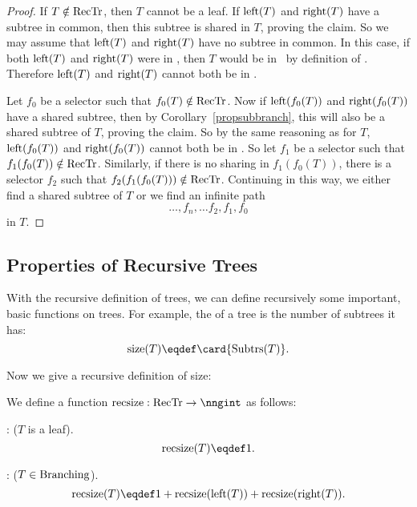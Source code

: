 \begin{proof}
If $T \notin \text{RecTr}$, then $T$ cannot be a leaf.  If $\text{left}(T)$
and $\text{right}(T)$ have a subtree in common, then this subtree is
shared in $T$, proving the claim.  So we may assume that
$\text{left}(T)$ and $\text{right}(T)$ have no subtree in common.  In
this case, if both $\text{left}(T)$ and $\text{right}(T)$ were in
\rectr, then $T$ would be in \rectr\ by definition of \rectr.
Therefore $\text{left}(T)$ and $\text{right}(T)$ cannot both be in
\rectr.

Let $f_0$ be a selector such that $f_0(T) \notin \text{RecTr}$.  Now if
$\text{left}(f_0(T))$ and $\text{right}(f_0(T))$ have a shared subtree,
then by Corollary~\ref{propsubbranch}, this will also be a shared
subtree of $T$, proving the claim.  So by the same reasoning as for
$T$, $\text{left}(f_0(T))$ and $\text{right}(f_0(T))$ cannot both be in
\rectr.  So let $f_1$ be a selector such that $f_1(f_0(T)) \notin
\text{RecTr}$.  Similarly, if there is no sharing in $f_1(f_0(T))$, there is
a selector $f_2$ such that $f_2(f_1(f_0(T))) \notin \text{RecTr}$.
Continuing in this way, we either find a shared subtree of $T$ or we
find an infinite path
\[
\dots,f_n,\dots f_2,f_1,f_0
\]
in $T$.
\end{proof}

\subsection{Properties of Recursive Trees}

With the recursive definition of trees, we can define recursively
some important, basic functions on trees.  For example, the
 of a tree is the number of subtrees it has:
\begin{equation}\label{treesizedef}
\text{size}(T) \eqdef \card{\subbrn{T}}.
\end{equation}

Now we give a recursive definition of size:
\begin{definition}
We define a function $\trsize{}: \rectr \to \nngint$ as follows:

: ($T$ is a leaf).
\[
\trsize{(T)} \eqdef 1.
\]

: ($T \in \text{Branching}$).
\[
\trsize{(T)} \eqdef 1 + \trsize{(\leftsub{(T)})} + \trsize{(\rightsub{(T)})}.
\]
\end{definition}

